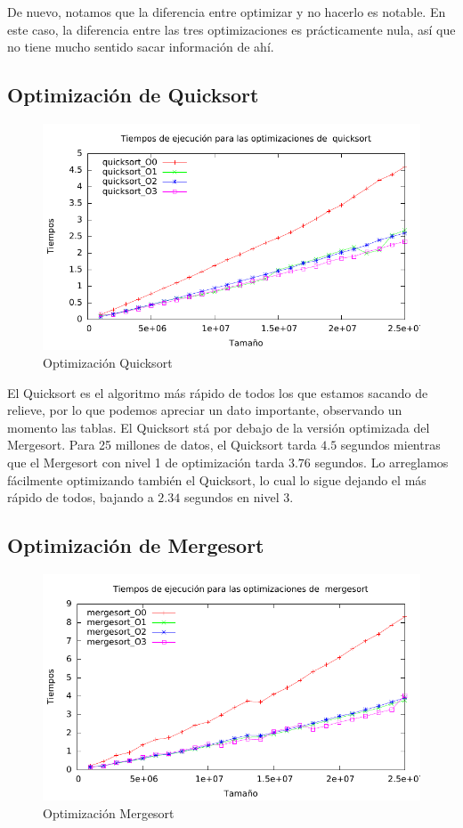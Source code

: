 \documentclass[a4paper, 11pt]{article}
\begin{document}
De nuevo, notamos que la diferencia entre optimizar y no hacerlo es notable. En este caso, la diferencia entre las tres optimizaciones es prácticamente nula, así que no tiene mucho sentido sacar información de ahí.

\newpage
\subsection{Optimización de Quicksort}

\begin{figure}[H]\includegraphics[width=12cm]{img/quicksort_optim_g.pdf} \centering
	\caption{Optimización Quicksort}\end{figure}

El Quicksort es el algoritmo más rápido de todos los que estamos sacando de relieve, por lo que podemos apreciar un dato importante, observando un momento las tablas. El Quicksort stá por debajo de la versión optimizada del Mergesort. Para 25 millones de datos, el Quicksort tarda $4.5$ segundos mientras que el Mergesort con nivel 1 de optimización tarda $3.76$ segundos. Lo arreglamos fácilmente optimizando también el Quicksort, lo cual lo sigue dejando el más rápido de todos, bajando a $2.34$ segundos en nivel 3.
\newpage
\subsection{Optimización de Mergesort}

\begin{figure}[H]\includegraphics[width=13cm]{img/mergesort_optim_g.pdf} \centering
	\caption{Optimización Mergesort}\end{figure}
\end{document}
